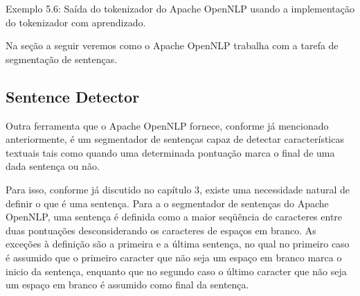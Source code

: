 \documentclass[11pt]{report}
\begin{document}
\begin{quote}
                 
             
     \fbox{,}                    \fbox{,}                   \fbox{,}            
   
\end{quote}
\begin{center}
  Exemplo 5.6: Saída do tokenizador do Apache OpenNLP usando a implementação do tokenizador com aprendizado.
\end{center}

Na seção a seguir veremos como o Apache OpenNLP trabalha com a tarefa de segmentação de sentenças.

\subsection{Sentence Detector}

\indent\indent Outra ferramenta que o Apache OpenNLP fornece, conforme já mencionado anteriormente, é um segmentador de sentenças capaz de detectar características textuais
tais como quando uma determinada pontuação marca o final de uma dada sentença ou não.

Para isso, conforme já discutido no capítulo 3, existe uma
necessidade natural de definir o que é uma sentença. Para a o segmentador de sentenças do Apache OpenNLP, uma sentença é definida como a maior seqüência de caracteres entre duas
pontuações desconsiderando os caracteres de espaços em branco. As exceções à definição são a primeira e a última sentença, no qual no primeiro caso é assumido que o primeiro caracter que não
seja um espaço em branco marca o inicio da sentença, enquanto que no segundo caso o último caracter que não seja um espaço em branco é assumido como final da sentença.
\end{document}
